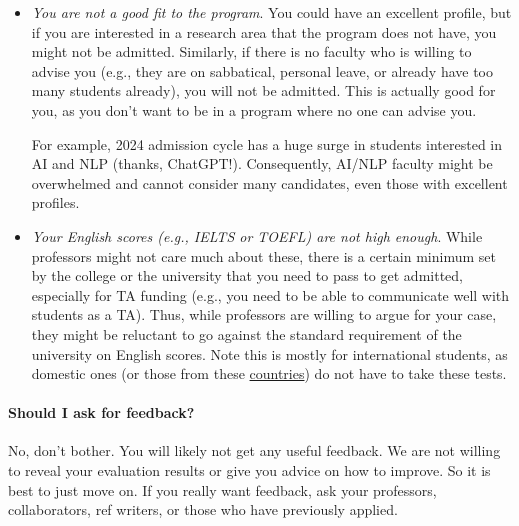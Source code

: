 \documentclass[oneside,11pt,dvipsnames]{book}
\begin{document}
\begin{itemize}

\item \emph{You are not a good fit to the program}.  You could have an excellent profile, but if you are interested in a research area that the program does not have, you might not be admitted.
Similarly, if there is no faculty who is willing to advise you (e.g., they are on sabbatical, personal leave, or already have too many students already), you will not be admitted.  This is actually good for you, as you don't want to be in a program where no one can advise you.

For example, 2024 admission cycle has a huge surge in students interested in AI and NLP (thanks, ChatGPT!). Consequently, AI/NLP faculty might be overwhelmed and cannot consider many candidates, even those with excellent profiles.

\item  \emph{Your English scores (e.g., IELTS or TOEFL) are not high enough}.  While professors might not care much about these, there is a certain minimum set by the college or the university that you need to pass to get admitted, especially for TA funding (e.g., you need to be able to communicate well with students as a TA).  Thus, while professors are willing to argue for your case, they might be reluctant to go against the standard requirement of the university on English scores.  Note this is mostly for international students, as domestic ones (or those from these \href{https://github.com/dynaroars/dynaroars.github.io/wiki/About-GMU#standard-tests-waiver-eligible-countries}{countries}) do not have to take these tests.


\end{itemize}

\paragraph{Should I ask for feedback?}
No, don't bother.  You will likely not get any useful feedback.  We are not willing to reveal your evaluation results or give you advice on how to improve. So it is best to just move on.  If you really want feedback, ask your professors, collaborators, ref writers, or those who have previously applied.

\end{document}
